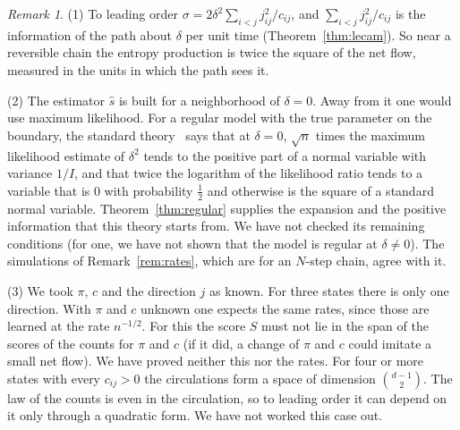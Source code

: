 \documentclass[11pt]{article}
\theoremstyle{definition}
\theoremstyle{remark}
\newtheorem{remark}[theorem]{Remark}
\begin{document}
\begin{remark}\label{rem:test}
(1) To leading order $\sigma=2\delta^2\sum_{i<j}j_{ij}^2/c_{ij}$, and
$\sum_{i<j}j_{ij}^2/c_{ij}$ is the information of the path about $\delta$ per
unit time (Theorem~\ref{thm:lecam}). So near a reversible chain the entropy
production is twice the square of the net flow, measured in the units in
which the path sees it.

(2) The estimator $\hat s$ is built for a neighborhood of $\delta=0$. Away
from it one would use maximum likelihood. For a regular model with the true
parameter on the boundary, the standard theory~\cite{chernoff1954,sl1987}
says that at $\delta=0$, $\sqrt n$ times the maximum likelihood estimate of
$\delta^2$ tends to the positive part of a normal variable with variance
$1/I$, and that twice the logarithm of the likelihood ratio tends to a
variable that is $0$ with probability $\frac12$ and otherwise is the square of
a standard normal variable. Theorem~\ref{thm:regular} supplies the expansion
and the positive information that this theory starts from. We have not
checked its remaining conditions (for one, we have not shown that the model
is regular at $\delta\ne0$). The simulations of Remark~\ref{rem:rates}, which
are for an $N$-step chain, agree with it.

(3) We took $\pi$, $c$ and the direction $j$ as known. For three states there
is only one direction. With $\pi$ and $c$ unknown one expects the same
rates, since those are learned at the rate $n^{-1/2}$. For this the score $S$
must not lie in the span of the scores of the counts for $\pi$ and $c$ (if it
did, a change of $\pi$ and $c$ could imitate a small net flow). We have proved
neither this nor the rates. For four or more states with every $c_{ij}>0$ the circulations form a
space of dimension $\binom{d-1}2$. The law of the counts is even in the
circulation, so to leading order it can depend on it only through a quadratic
form. We have not worked this case out.
\end{remark}
\end{document}
